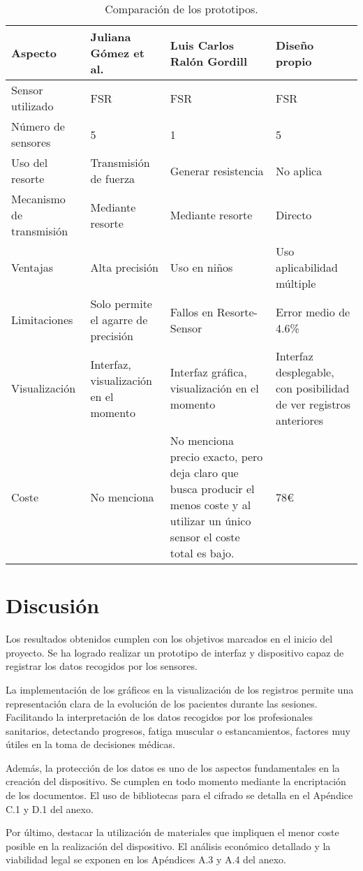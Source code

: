\begin{table}[h]
    \centering
    \begin{tabular}{|p{2.5cm}|p{3.5cm}|p{4cm}|p{3.8cm}|}
    \rowcolor[HTML]{BFBFBF} 
    \hline
    \textbf{Aspecto} & \textbf{Juliana Gómez et al.} & \textbf{Luis Carlos Ralón Gordill} & \textbf{Diseño propio} \\ \hline
    Sensor utilizado   & FSR  & FSR  & FSR \\ \hline
    Número de sensores   & 5  & 1  & 5 \\ \hline
    Uso del resorte & Transmisión de fuerza & Generar resistencia  & No aplica   \\ \hline
    Mecanismo de transmisión   & Mediante resorte  & Mediante resorte & Directo  \\ \hline
    Ventajas   & Alta precisión  & Uso en niños  & Uso aplicabilidad múltiple \\ \hline
    Limitaciones & Solo permite el agarre de precisión & Fallos en Resorte-Sensor & Error medio de 4.6\% \\ \hline
    Visualización & Interfaz, visualización en el momento & Interfaz gráfica, visualización en el momento& Interfaz desplegable, con posibilidad de ver registros anteriores \\ \hline
    Coste    & No menciona    & No menciona precio exacto, pero deja claro que busca producir el menos coste y al utilizar un único sensor el coste total es bajo. & 78€ \\ \hline
    \end{tabular}
    \caption{Comparación de los prototipos.}
    \label{tab:comparacion_diseños}
\end{table}
    
\section{Discusión}

Los resultados obtenidos cumplen con los objetivos marcados en el inicio del proyecto. Se ha logrado realizar un prototipo de interfaz y dispositivo capaz de registrar los datos recogidos por los sensores.

La implementación de los gráficos en la visualización de los registros permite una representación clara de la evolución de los pacientes durante las sesiones. Facilitando la interpretación de los datos recogidos por los profesionales sanitarios, detectando progresos, fatiga muscular o estancamientos, factores muy útiles en la toma de decisiones médicas.

Además, la protección de los datos es uno de los aspectos fundamentales en la creación del dispositivo. Se cumplen en todo momento mediante la encriptación de los documentos. El uso de bibliotecas para el cifrado se detalla en el Apéndice C.1 y D.1 del anexo.

Por último, destacar la utilización de materiales que impliquen el menor coste posible en la realización del dispositivo. El análisis económico detallado y la viabilidad legal se exponen en los Apéndices A.3 y A.4 del anexo.